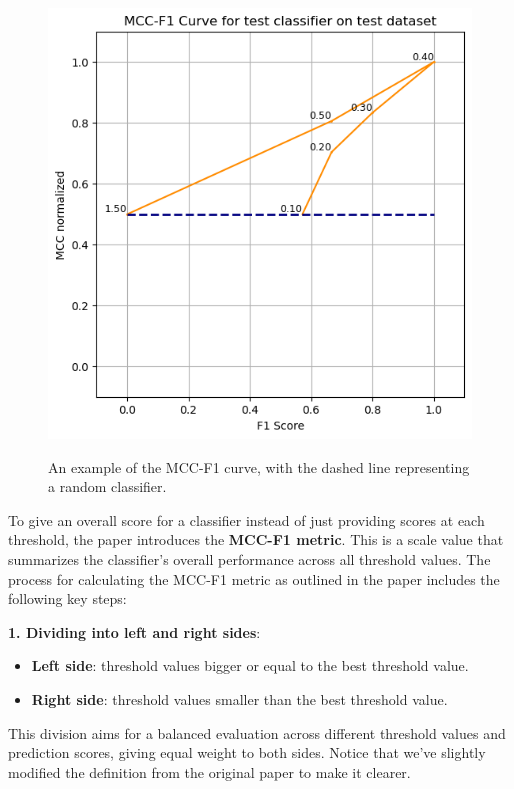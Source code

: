 \documentclass[12pt, oneside]{amsart}
\theoremstyle{definition}
\theoremstyle{remark}
\numberwithin{equation}{section}
\begin{document}
\begin{figure}[hbt!]
    \centering
    \includegraphics[scale=0.4]{Report/Figure/figure1.jpg}
    \label{figure1}
    \caption{An example of the MCC-F1 curve, with the dashed line representing a random classifier.}
\end{figure}
\FloatBarrier


To give an overall score for a classifier instead of just providing scores at each threshold, the paper introduces the \textbf{MCC-F1 metric}. This is a scale value that summarizes the classifier's overall performance across all threshold values. The process for calculating the MCC-F1 metric as outlined in the paper includes the following key steps:

\textbf{1. Dividing into left and right sides}:
   \begin{itemize}
      \item \textbf{Left side}: threshold values bigger or equal to the best threshold value. 
      \item \textbf{Right side}: threshold values smaller than the best threshold value. 
   \end{itemize}
   This division aims for a balanced evaluation across different threshold values and prediction scores, giving equal weight to both sides. Notice that we've slightly modified the definition from the original paper to make it clearer.
   
\end{document}
